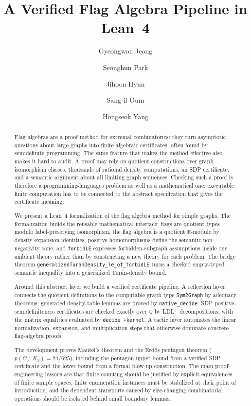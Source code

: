 \documentclass{article}
\title{A Verified Flag Algebra Pipeline in Lean~4}
\date{}
\author[1]{Gyeongwon Jeong}
\author[1]{Seonghun Park}
\author[1]{Jihoon Hyun}
\author[2]{Sang-il Oum}
\author[3]{Hongseok Yang}
\affil[1]{School of Computing, KAIST, South Korea}
\affil[2]{Discrete Mathematics Group, Institute for Basic Science (IBS), South Korea}
\affil[3]{School of Computational Sciences, Korea Institute for Advanced Study (KIAS), South Korea}
\newcommand{\tdensity}[2]{p(#1;\,#2)}
\newcommand{\lean}[1]{\texttt{#1}}
\begin{document}
\maketitle

\begin{abstract}
Flag algebras are a proof method for extremal combinatorics: they turn
asymptotic questions about large graphs into finite algebraic certificates,
often found by semidefinite programming.  The same feature that makes the
method effective also makes it hard to audit.  A proof may rely on quotient
constructions over graph isomorphism classes, thousands of rational density
computations, an SDP certificate, and a semantic argument about all limiting
graph sequences.  Checking such a proof is therefore a programming-languages
problem as well as a mathematical one: executable finite computation has to be
connected to the abstract specification that gives the certificate meaning.

We present a Lean~4 formalization of the flag algebra method for simple
graphs.  The formalization builds the reusable mathematical interface:
flags are quotient types modulo label-preserving isomorphism, the flag algebra
is a quotient $\mathbb{R}$-module by density-expansion identities, positive
homomorphisms define the semantic non-negativity cone, and
\lean{forbidLE} expresses forbidden-subgraph assumptions inside one ambient
theory rather than by constructing a new theory for each problem.  The bridge
theorem \lean{generalizedTuranDensity\_le\_of\_forbidLE} turns a checked
empty-typed semantic inequality into a generalized Tur\'an-density bound.

Around this abstract layer we build a verified certificate pipeline.  A
reflection layer connects the quotient definitions to the computable graph type
\lean{Sym2Graph} by adequacy theorems; generated density-table lemmas are
proved by \lean{native\_decide}.  SDP positive-semidefiniteness certificates
are checked exactly over $\mathbb{Q}$ by LDL$^\top$ decompositions, with the
matrix equalities evaluated by \lean{decide +kernel}.  A tactic layer automates
the linear normalization, expansion, and multiplication steps that otherwise
dominate concrete flag-algebra proofs.

The development proves Mantel's theorem and the Erd\H{o}s pentagon theorem
($\tdensity{C_5}{K_3}=24/625$), including the pentagon upper bound from a
verified SDP certificate and the lower bound from a formal blow-up
construction.  The main proof-engineering lessons are that finite counting
should be justified by explicit equivalences of finite sample spaces, finite
enumeration instances must be stabilized at their point of introduction, and
the dependent transports caused by size-changing combinatorial operations
should be isolated behind small boundary lemmas.
\end{abstract}
\end{document}
